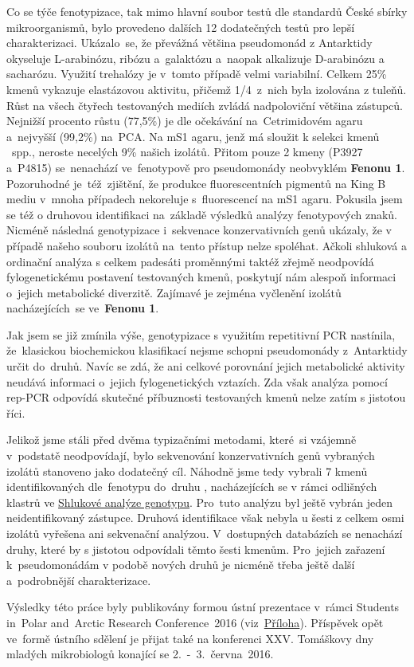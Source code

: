 Co se týče fenotypizace, tak mimo hlavní soubor testů dle standardů České sbírky mikroorganismů, bylo provedeno dalších 12 dodatečných testů pro lepší charakterizaci.
Ukázalo~se, že převážná většina pseudomonád z Antarktidy okyseluje L-arabinózu, ribózu a~galaktózu a~naopak alkalizuje D-arabinózu a sacharózu.
Využití trehalózy je v~tomto případě velmi variabilní.
Celkem 25\% kmenů vykazuje elastázovou aktivitu, přičemž 1/4~z~nich byla izolována z tuleňů.
Růst na všech čtyřech testovaných mediích zvládá nadpoloviční většina zástupců.
Nejnižší procento růstu (77,5\%) je dle očekávání na~Cetrimidovém agaru a~nejvyšší (99,2\%) na~PCA.
Na mS1 agaru, jenž má sloužit k selekci kmenů ~spp., neroste necelých 9\% našich izolátů.
Přitom pouze 2 kmeny (P3927 a~P4815) se~nenachází ve~fenotypově pro pseudomonády neobvyklém \textbf{\textcolor[RGB]{255, 0, 0}{Fenonu 1}}.
Pozoruhodné je~též~zjištění, že produkce fluorescentních pigmentů na King B mediu v~mnoha případech nekoreluje s~fluorescencí na mS1 agaru.
Pokusila jsem se též o druhovou identifikaci na~základě výsledků analýzy fenotypových znaků.
Nicméně následná genotypizace i~sekvenace konzervativních genů ukázaly, že v případě našeho souboru izolátů na~tento přístup nelze spoléhat.
Ačkoli shluková a ordinační analýza s celkem padesáti proměnnými taktéž zřejmě neodpovídá fylogenetickému postavení testovaných kmenů, poskytují nám alespoň informaci o~jejich metabolické diverzitě.
Zajímavé je zejména vyčlenění izolátů nacházejících~se ve~\textbf{\textcolor[RGB]{255, 0, 0}{Fenonu 1}}.

Jak jsem se již zmínila výše, genotypizace s využitím repetitivní PCR nastínila, že~klasickou biochemickou klasifikací nejsme schopni pseudomonády z~Antarktidy určit do~druhů.
Navíc se zdá, že ani celkové porovnání jejich metabolické aktivity neudává informaci o~jejich fylogenetických vztazích.
Zda však analýza pomocí rep-PCR odpovídá skutečné příbuznosti testovaných kmenů nelze zatím s jistotou říci.

Jelikož jsme stáli před dvěma typizačními metodami, které~si vzájemně v~podstatě neodpovídají, bylo sekvenování konzervativních genů vybraných izolátů stanoveno jako dodatečný cíl.
Náhodně jsme tedy vybrali 7 kmenů identifikovaných dle~fenotypu do~druhu , nacházejících se v rámci odlišných klastrů ve \hyperlink{genotyp.1}{Shlukové analýze genotypu}.
Pro~tuto analýzu byl ještě vybrán jeden neidentifikovaný zástupce.
Druhová identifikace však nebyla u šesti z celkem osmi izolátů vyřešena ani sekvenační analýzou.
V~dostupných databázích se nenachází druhy, které by s jistotou odpovídali těmto šesti kmenům.
Pro~jejich zařazení k~pseudomonádám v podobě nových druhů je nicméně třeba ještě další a~podrobnější charakterizace.

Výsledky této práce byly publikovány formou ústní prezentace v~rámci Students in~Polar and~Arctic Research Conference~2016 (viz~\hyperlink{SPARC.1}{Příloha}).
Příspěvek opět ve~formě ústního sdělení je přijat také na konferenci XXV. Tomáškovy dny mladých mikrobiologů konající se 2.~-~3.~června~2016.

\shorthandon{-}
\cleardoublepage

